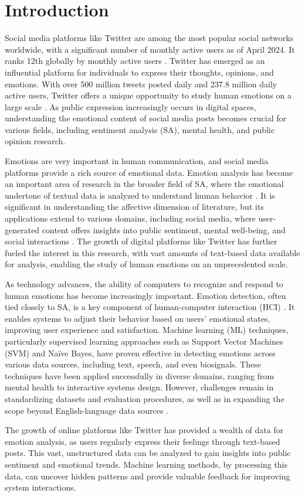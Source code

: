 

\section{Introduction}

Social media platforms like Twitter are among the most popular social networks worldwide, with a significant number of monthly active users as of April 2024. It ranks 12th globally by monthly active users \cite{statistica2023}. Twitter has emerged as an influential platform for individuals to express their thoughts, opinions, and emotions. With over 500 million tweets posted daily and 237.8 million daily active users, Twitter offers a unique opportunity to study human emotions on a large scale \cite{internetlivestats2023}\cite{twitterstats2023}. As public expression increasingly occurs in digital spaces, understanding the emotional content of social media posts becomes crucial for various fields, including sentiment analysis (SA), mental health, and public opinion research.

Emotions are very important in human communication, and social media platforms provide a rich source of emotional data. Emotion analysis has become an important area of research in the broader field of SA, where the emotional undertone of textual data is analyzed to understand human behavior \cite{Kim2019}. It is significant in understanding the affective dimension of literature, but its applications extend to various domains, including social media, where user-generated content offers insights into public sentiment, mental well-being, and social interactions \cite{Hakak2017}. The growth of digital platforms like Twitter has further fueled the interest in this research, with vast amounts of text-based data available for analysis, enabling the study of human emotions on an unprecedented scale.

As technology advances, the ability of computers to recognize and respond to human emotions has become increasingly important. Emotion detection, often tied closely to SA, is a key component of human-computer interaction (HCI) \cite{Alslaity2022}. It enables systems to adjust their behavior based on users' emotional states, improving user experience and satisfaction. Machine learning (ML) techniques, particularly supervised learning approaches such as Support Vector Machines (SVM) and Naïve Bayes, have proven effective in detecting emotions across various data sources, including text, speech, and even biosignals. These techniques have been applied successfully in diverse domains, ranging from mental health to interactive systems design. However, challenges remain in standardizing datasets and evaluation procedures, as well as in expanding the scope beyond English-language data sources \cite{Alslaity2022}.

The growth of online platforms like Twitter has provided a wealth of data for emotion analysis, as users regularly express their feelings through text-based posts. This vast, unstructured data can be analyzed to gain insights into public sentiment and emotional trends. Machine learning methods, by processing this data, can uncover hidden patterns and provide valuable feedback for improving system interactions. 
